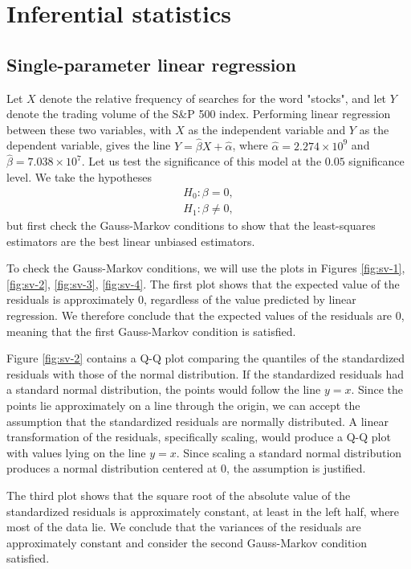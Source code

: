 \documentclass[../main.tex]{subfiles}
\begin{document}
\newpage
\section{Inferential statistics}

\subsection{Single-parameter linear regression}
Let $X$ denote the relative frequency of searches for the word "stocks", and let $Y$ denote the trading volume of the S\&P 500 index.
Performing linear regression between these two variables, with $X$ as the independent variable and $Y$ as the dependent variable, gives the line $Y = \hat{\beta} X + \hat{\alpha}$, where $\hat{\alpha} = 2.274 \times 10^9$ and $\hat{\beta} = 7.038 \times 10^7$.
Let us test the significance of this model at the $0.05$ significance level. We take the hypotheses
\begin{align*}
H_0: \beta = 0, \\
H_1: \beta \ne 0,
\end{align*}
but first check the Gauss-Markov conditions to show that the least-squares estimators are the best linear unbiased estimators.


To check the Gauss-Markov conditions, we will use the plots in Figures \ref{fig:sv-1}, \ref{fig:sv-2}, \ref{fig:sv-3}, \ref{fig:sv-4}.
The first plot shows that the expected value of the residuals is approximately $0$, regardless of the value predicted by linear regression. We therefore conclude that the expected values of the residuals are $0$, meaning that the first Gauss-Markov condition is satisfied.

Figure \ref{fig:sv-2} contains a Q-Q plot comparing the quantiles of the standardized residuals with those of the normal distribution. If the standardized residuals had a standard normal distribution, the points would follow the line $y = x$. Since the points lie approximately on a line through the origin, we can accept the assumption that the standardized residuals are normally distributed. A linear transformation of the residuals, specifically scaling, would produce a Q-Q plot with values lying on the line $y = x$. Since scaling a standard normal distribution produces a normal distribution centered at $0$, the assumption is justified.

The third plot shows that the square root of the absolute value of the standardized residuals is approximately constant, at least in the left half, where most of the data lie. We conclude that the variances of the residuals are approximately constant and consider the second Gauss-Markov condition satisfied.
\end{document}
